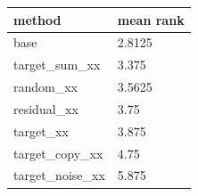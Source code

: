 \begin{tabular}{ll}
\toprule
method & mean rank \\
\midrule
base & 2.8125 \\
target\_sum\_xx & 3.375 \\
random\_xx & 3.5625 \\
residual\_xx & 3.75 \\
target\_xx & 3.875 \\
target\_copy\_xx & 4.75 \\
target\_noise\_xx & 5.875 \\
\bottomrule
\end{tabular}
